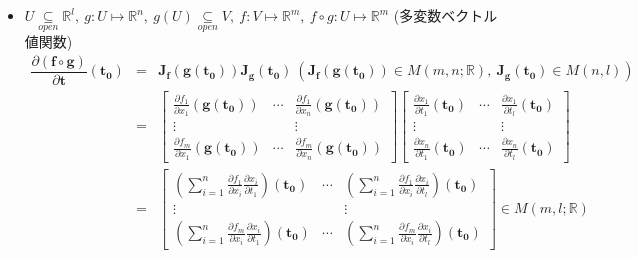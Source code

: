 \documentclass[dvipdfmx]{jsarticle}
\begin{document}
\begin{description}
\begin{itemize}
                    \begin{proof}
                        $f(\bm{x}+\bm{k}) - f(\bm{x}) = f(\bm{g}(t + h)) - f(\bm{g}(t)) = (\mathrm{grad} \ f) \cdot (\bm{g}(t+h)-\bm{g}(t)) + o(||\bm{k}||) $
                    \end{proof}
                    
                \item $U \underset{open}{\subseteq} \mathbb{R}^l,\ g : U  \mapsto \mathbb{R}^n,\ g(U) \underset{open}{\subseteq} V,\ f : V \mapsto \mathbb{R}^m,\ f \circ g : U \mapsto \mathbb{R}^m$ (多変数ベクトル値関数)
                    \begin{eqnarray*}
                        \dfrac{\partial (\bm{f \circ g})}{\partial \bm{t}}(\bm{t_0}) &=& \bm{J_f}(\bm{g}(\bm{t_0})) \bm{J_g}(\bm{t_0}) \ ( \bm{J_f}(\bm{g}(\bm{t_0})) \in M(m,n;\mathbb{R}),\ \bm{J_g}(\bm{t_0}) \in M(n,l) )\\
                            &=& \begin{bmatrix}
                                \frac{\partial f_1}{\partial x_1}(\bm{g}(\bm{t_0})) & \cdots & \frac{\partial f_1}{\partial x_n}(\bm{g}(\bm{t_0}))\\
                                \vdots & & \vdots \\
                                \frac{\partial f_m}{\partial x_1}(\bm{g}(\bm{t_0})) & \cdots & \frac{\partial f_m}{\partial x_n}(\bm{g}(\bm{t_0}))
                            \end{bmatrix} \begin{bmatrix}
                                \frac{\partial x_1}{\partial t_1}(\bm{t_0}) & \cdots & \frac{\partial x_1}{\partial t_l}(\bm{t_0}) \\
                                \vdots & & \vdots \\
                                \frac{\partial x_n}{\partial t_1}(\bm{t_0}) & \cdots & \frac{\partial x_n}{\partial t_l}(\bm{t_0})
                            \end{bmatrix} \\
                            &=& \begin{bmatrix}
                                (\sum_{i=1}^n \frac{\partial f_1}{\partial x_i} \frac{\partial x_i}{\partial t_1})(\bm{t_0}) & \cdots & (\sum_{i=1}^n \frac{\partial f_1}{\partial x_i} \frac{\partial x_i}{\partial t_l})(\bm{t_0}) \\
                                \vdots & & \vdots \\
                                (\sum_{i=1}^n \frac{\partial f_m}{\partial x_i} \frac{\partial x_i}{\partial t_1})(\bm{t_0}) & \cdots & (\sum_{i=1}^n \frac{\partial f_m}{\partial x_i} \frac{\partial x_i}{\partial t_l})(\bm{t_0})
                            \end{bmatrix} \in M(m,l;\mathbb{R})
                    \end{eqnarray*}
            \end{itemize}


\end{description}
\end{document}
